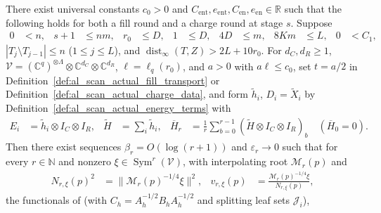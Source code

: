 \begin{lemma}
    \label{thm:al_scan_actual_transport_estimates}
    \leanok
    There exist universal constants
    $c_0>0$ and $C_{\mathrm{ent}},e_{\mathrm{ent}},C_{\mathrm{en}},e_{\mathrm{en}}\in\mathbb R$
    such that the following holds for both a fill round and a charge round at
    stage $s$. Suppose
    \begin{align}
        0  & <n,    & s+1 & \le nm, & r_0 & \le D, & 1 & \le D, &
        4D & \le m, & 8Km & \le L,  & 0   & <C_1,
        \label{eq:al_scan_transport_scales}
    \end{align}
    $|T_j\setminus T_{j-1}|\le n$ ($1\le j\le L$), and
    $\operatorname{dist}_\infty(T,Z)>2L+10r_0$. For $d_C,d_R\ge1$,
    $\mathcal V=(\mathbb C^q)^{\otimes\Lambda}\otimes\mathbb C^{d_C}\otimes\mathbb C^{d_R}$,
    $\ell=\ell_q(r_0)$, and $a>0$ with $a\ell\le c_0$, set $t=a/2$ in
    Definition~\ref{def:al_scan_actual_fill_transport} or
    Definition~\ref{def:al_scan_actual_charge_data}, and form $\widetilde h_i$,
    $D_i=\widetilde X_i$ by Definition~\ref{def:al_scan_actual_energy_terms} with
    \begin{align}
        E_i           & =\widetilde h_i\otimes I_C\otimes I_R, &
        \widetilde H  & =\sum_i\widetilde h_i,                 &
        \overline H_r & =\frac1r\sum_{b=0}^{r-1}
        (\widetilde H\otimes I_C\otimes I_R)_b\quad(\overline H_0=0).
        \label{eq:al_scan_transport_energy}
    \end{align}
    Then there exist sequences $\beta_r=O(\log(r+1))$ and $\varepsilon_r\to0$
    such that for every $r\in\mathbb N$ and nonzero
    $\xi\in\operatorname{Sym}^r(\mathcal V)$, with interpolating root
    $\mathcal M_r(p)$ and
    \begin{align}
        N_{r,\xi}(p)^2 & =\|\mathcal M_r(p)^{-1/4}\xi\|^2,                &
        v_{r,\xi}(p)   & =\frac{\mathcal M_r(p)^{-1/4}\xi}{N_{r,\xi}(p)},
        \label{eq:al_scan_transport_vector}
    \end{align}
    the functionals of \cite[Proposition~7.4]{OpenAI2026AreaLaw}
    (with $C_h=A_h^{-1/2}B_hA_h^{-1/2}$ and splitting leaf sets $\mathcal J_i$),
    \begin{align}

\end{align}
\end{lemma}
